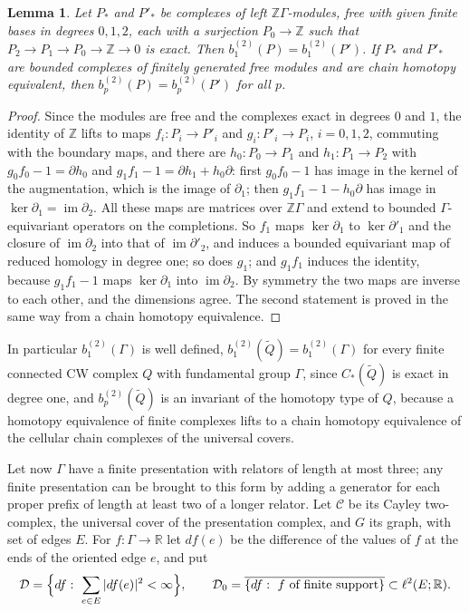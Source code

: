 \documentclass[11pt,a4paper]{article}
\newtheorem{lemma}{Lemma}[section]
\theoremstyle{definition}
\theoremstyle{remark}
\newcommand{\Z}{\mathbb{Z}}
\newcommand{\R}{\mathbb{R}}
\newcommand{\Gam}{\Gamma}
\newcommand{\lt}{\ell^2}
\newcommand{\bt}[1]{b^{(2)}_{#1}}
\newcommand{\Dsp}{\mathcal{D}}
\newcommand{\Cay}{\mathcal{C}}
\begin{document}
\begin{lemma}\label{lem:comparison}
Let $P_*$ and $P'_*$ be complexes of left $\Z\Gam$-modules, free with given finite
bases in degrees $0,1,2$, each with a surjection $P_0\to\Z$ such that
$P_2\to P_1\to P_0\to\Z\to0$ is exact. Then $\bt{1}(P)=\bt{1}(P')$. If $P_*$ and
$P'_*$ are bounded complexes of finitely generated free modules and are chain
homotopy equivalent, then $\bt{p}(P)=\bt{p}(P')$ for all $p$.
\end{lemma}
\begin{proof}
Since the modules are free and the complexes exact in degrees $0$ and $1$, the
identity of $\Z$ lifts to maps $f_i:P_i\to P'_i$ and $g_i:P'_i\to P_i$,
$i=0,1,2$, commuting with the boundary maps, and there are $h_0:P_0\to P_1$ and
$h_1:P_1\to P_2$ with $g_0f_0-1=\partial h_0$ and
$g_1f_1-1=\partial h_1+h_0\partial$: first $g_0f_0-1$ has image in the kernel of
the augmentation, which is the image of $\partial_1$; then
$g_1f_1-1-h_0\partial$ has image in $\ker\partial_1=\operatorname{im}\partial_2$.
All these maps are matrices over $\Z\Gam$ and extend to bounded $\Gam$-equivariant
operators on the completions. So $f_1$ maps $\ker\partial_1$ to $\ker\partial'_1$
and the closure of $\operatorname{im}\partial_2$ into that of
$\operatorname{im}\partial'_2$, and induces a bounded equivariant map of reduced
homology in degree one; so does $g_1$; and $g_1f_1$ induces the identity, because
$g_1f_1-1$ maps $\ker\partial_1$ into $\operatorname{im}\partial_2$. By symmetry
the two maps are inverse to each other, and the dimensions agree. The second
statement is proved in the same way from a chain homotopy equivalence.
\end{proof}

In particular $\bt{1}(\Gam)$ is well defined, $\bt{1}(\widetilde Q)=\bt{1}(\Gam)$ for
every finite connected CW complex $Q$ with fundamental group $\Gam$, since
$C_*(\widetilde Q)$ is exact in degree one, and $\bt{p}(\widetilde Q)$ is an
invariant of the homotopy type of $Q$, because a homotopy equivalence of finite
complexes lifts to a chain homotopy equivalence of the cellular chain complexes of
the universal covers.

Let now $\Gam$ have a finite presentation with relators of length at most three; any
finite presentation can be brought to this form by adding a generator for each
proper prefix of length at least two of a longer relator. Let $\Cay$ be its Cayley
two-complex, the universal cover of the presentation complex, and $G$ its graph,
with set of edges $E$. For $f:\Gam\to\R$ let $df(e)$ be the difference of the values
of $f$ at the ends of the oriented edge $e$, and put
\[
 \Dsp=\Bigl\{df:\ \sum_{e\in E}|df(e)|^2<\infty\Bigr\},\qquad
 \Dsp_0=\overline{\{df:\ f\text{ of finite support}\}}\subset\lt(E;\R).
\]
\end{document}
